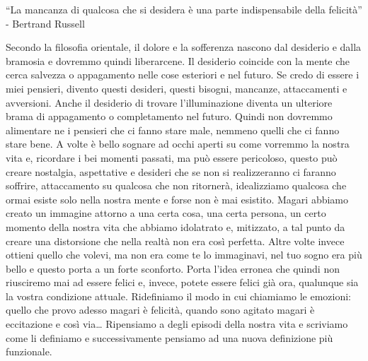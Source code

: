 \documentclass[12pt]{book} %
\begin{document}
“La mancanza di qualcosa che si desidera è una parte indispensabile della felicità” - Bertrand Russell

Secondo la filosofia orientale, il dolore e la sofferenza nascono dal desiderio e dalla bramosia e dovremmo quindi
liberarcene. Il desiderio coincide con la mente che cerca salvezza o appagamento nelle cose esteriori e nel futuro. Se
credo di essere i miei pensieri, divento questi desideri, questi bisogni, mancanze, attaccamenti e avversioni. Anche il
desiderio di trovare l'illuminazione diventa un ulteriore brama di appagamento o completamento nel
futuro. Quindi non dovremmo alimentare ne i pensieri che ci fanno stare male, nemmeno quelli che ci fanno stare bene. A
volte è bello sognare ad occhi aperti su come vorremmo la nostra vita e, ricordare i bei momenti passati, ma può essere
pericoloso, questo può creare nostalgia, aspettative e desideri che se non si realizzeranno ci faranno soffrire, attaccamento
su qualcosa che non ritornerà, idealizziamo qualcosa che ormai esiste solo nella nostra mente e forse non è mai
esistito. Magari abbiamo creato un immagine attorno a una certa cosa, una certa persona, un certo momento della nostra
vita che abbiamo idolatrato e, mitizzato, a tal punto da creare una distorsione che nella realtà non era così perfetta.
Altre volte invece ottieni quello che volevi, ma non era come te lo immaginavi, nel tuo sogno era più bello e questo
porta a un forte sconforto. Porta l'idea erronea che quindi non riusciremo mai ad essere felici e, invece, potete
essere felici già ora, qualunque sia la vostra condizione attuale. Ridefiniamo il modo in cui chiamiamo le emozioni:
quello che provo adesso magari è felicità, quando sono agitato magari è eccitazione e così via… Ripensiamo a degli
episodi della nostra vita e scriviamo come li definiamo e successivamente pensiamo ad una nuova definizione più
funzionale.
\end{document}
